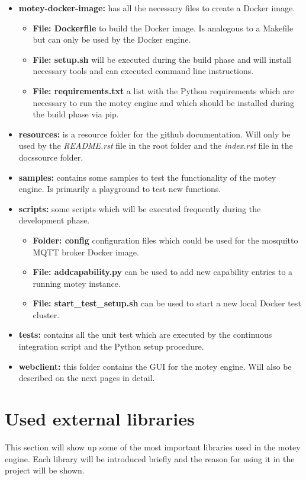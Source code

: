 \begin{itemize}
  \item{\textbf{motey-docker-image:}} has all the necessary files to create a Docker image.
  \begin{itemize}
    \item{\textbf{File: Dockerfile}} to build the Docker image. Is analogous to a Makefile but can only be used by the Docker engine.
    \item{\textbf{File: setup.sh}} will be executed during the build phase and will install necessary tools and can executed command line instructions.
    \item{\textbf{File: requirements.txt}} a list with the Python requirements which are necessary to run the motey engine and which should be installed during the build phase via pip.
  \end{itemize}
  \item{\textbf{resources:}} is a resource folder for the github documentation. Will only be used by the \textit{README.rst} file in the root folder and the \textit{index.rst} file in the docs\/source folder.
  \item{\textbf{samples:}} contains some samples to test the functionality of the motey engine. Is primarily a playground to test new functions.
  \item{\textbf{scripts:}} some scripts which will be executed frequently during the development phase.
  \begin{itemize}
    \item{\textbf{Folder: config}} configuration files which could be used for the mosquitto \ac{MQTT} broker Docker image.
    \item{\textbf{File: addcapability.py}} can be used to add new capability entries to a running motey instance.
    \item{\textbf{File: start\_test\_setup.sh}} can be used to start a new local Docker test cluster.
  \end{itemize}
  \item{\textbf{tests:}} contains all the unit test which are executed by the continuous integration script and the Python setup procedure.
  \item{\textbf{webclient:}} this folder contains the \ac{GUI} for the motey engine. Will also be described on the next pages in detail.
\end{itemize}

\section{Used external libraries}
This section will show up some of the most important libraries used in the motey engine.
Each library will be introduced briefly and the reason for using it in the project will be shown.

